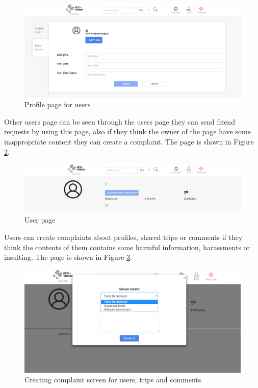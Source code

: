 \begin{figure}[!htbp]
\centering
\includegraphics[width=\textwidth]{projectChapters/images/profileWeb3.png}
\caption{Profile page for users}
\label{fig:profileWeb3}
\end{figure}

\newpage

Other users page can be seen through the users page they can send friend requests by using this page, also if they think the owner of the page have some inappropriate content they can create a complaint. The page is shown in Figure   \ref{fig:userpageWeb}.

\begin{figure}[!htbp]
\centering
\includegraphics[width=\textwidth]{projectChapters/images/userpageWeb.png}
\caption{User page}
\label{fig:userpageWeb}
\end{figure}

\newpage

Users can create complaints about profiles, shared trips or comments if they think the contents of them contains some harmful information, harassments or insulting. The page is shown in Figure \ref{fig:complaintPage}. 

\begin{figure}[!htbp]
\centering
\includegraphics[width=\textwidth]{projectChapters/images/complaintPage.png}
\caption{Creating complaint screen for users, trips and comments}
\label{fig:complaintPage}
\end{figure}

